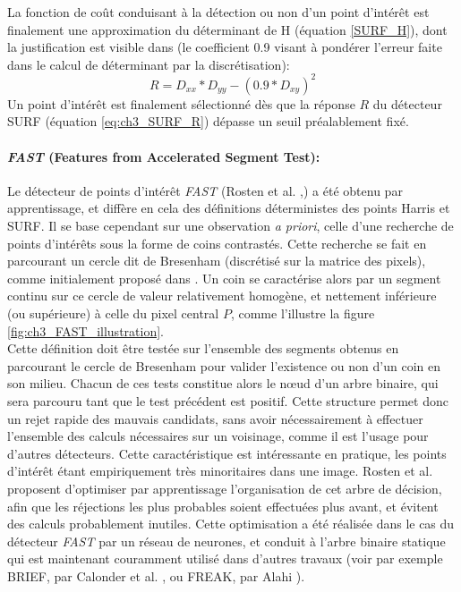 La fonction de coût conduisant à la détection ou non d'un point d'intérêt est finalement une approximation du déterminant de H (équation \ref{SURF_H}), dont la justification est visible dans \cite{Bay} (le coefficient 0.9 visant à pondérer l'erreur faite dans le calcul de déterminant par la discrétisation):
\begin{equation} \label{eq:ch3_SURF_R}
	R = D_{xx} * D_{yy} - (0.9 * D_{xy})^2
\end{equation}
Un point d'intérêt est finalement sélectionné dès que la réponse $R$ du détecteur SURF (équation \ref{eq:ch3_SURF_R}) dépasse un seuil préalablement fixé.

\paragraph{\emph{FAST} (Features from Accelerated Segment Test):\\}
Le détecteur de points d'intérêt \emph{FAST} (Rosten et al. ,\cite{Rosten}) a été obtenu par apprentissage, et diffère en cela des définitions \og déterministes\fg{} des points Harris et SURF. Il se base cependant sur une observation \emph{a priori}, celle d'une recherche de points d'intérêts sous la forme de \og coins\fg{} contrastés. Cette recherche se fait en parcourant un cercle dit de Bresenham (discrétisé sur la matrice des pixels), comme initialement proposé dans \cite{Rosten2005}. Un coin se caractérise alors par un segment continu sur ce cercle de valeur relativement homogène, et nettement inférieure (ou supérieure) à celle du pixel central $P$, comme l'illustre la figure \ref{fig:ch3_FAST_illustration}.\\

Cette définition doit être testée sur l'ensemble des segments obtenus en parcourant le cercle de Bresenham pour valider l'existence ou non d'un \og coin\fg{} en son milieu. Chacun de ces tests constitue alors le nœud d'un arbre binaire, qui sera parcouru tant que le test précédent est positif. Cette structure permet donc un rejet rapide des  mauvais candidats, sans avoir nécessairement à effectuer l'ensemble des calculs nécessaires sur un voisinage, comme il est l'usage pour d'autres détecteurs. Cette caractéristique est intéressante en pratique, les points d'intérêt étant empiriquement très minoritaires dans une image. Rosten et al. proposent d'optimiser par apprentissage l'organisation de cet arbre de décision, afin que les réjections les plus probables soient effectuées plus avant, et évitent des calculs probablement inutiles. Cette optimisation a été réalisée dans le cas du détecteur \emph{FAST} par un réseau de neurones, et conduit à l'arbre binaire statique qui est maintenant couramment utilisé dans d'autres travaux (voir par exemple BRIEF, par Calonder et al. \cite{Calonder2010}, ou FREAK, par Alahi \cite{Alahi}).

